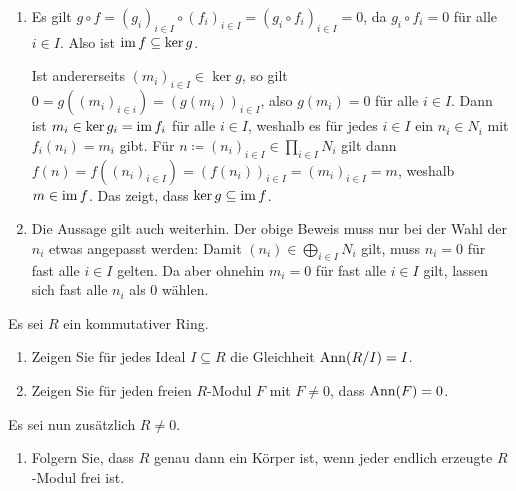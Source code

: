 \begin{solution}
  \begin{enumerate}
    \item
      Es gilt $g \circ f = (g_i)_{i \in I} \circ (f_i)_{i \in I} = (g_i \circ f_i)_{i \in I} = 0$, da $g_i \circ f_i = 0$ für alle $i \in I$.
      Also ist $\operatorname{im} f \subseteq \ker g$.
      
      Ist andererseits $(m_i)_{i \in I} \in \ker g$, so gilt $0 = g((m_i)_{i \in i}) = (g(m_i))_{i \in I}$, also $g(m_i) = 0$ für alle $i \in I$.
      Dann ist $m_i \in \ker g_i = \operatorname{im} f_i$ für alle $i \in I$, weshalb es für jedes $i \in I$ ein $n_i \in N_i$ mit $f_i(n_i) = m_i$ gibt.
      Für $n \coloneqq (n_i)_{i \in I} \in \prod_{i \in I} N_i$ gilt dann $f(n) = f((n_i)_{i \in I}) = (f(n_i))_{i \in I} = (m_i)_{i \in I} = m$, weshalb $m \in \operatorname{im} f$.
      Das zeigt, dass $\ker g \subseteq \operatorname{im} f$.
    \item
      Die Aussage gilt auch weiterhin.
      Der obige Beweis muss nur bei der Wahl der $n_i$ etwas angepasst werden:
      Damit $(n_i) \in \bigoplus_{i \in I} N_i$ gilt, muss $n_i = 0$ für fast alle $i \in I$ gelten.
      Da aber ohnehin $m_i = 0$ für fast alle $i \in I$ gilt, lassen sich fast alle $n_i$ als $0$ wählen.
  \end{enumerate}
\end{solution}


\begin{question}[subtitle = Annihilatoren von Quotienten]
  \label{question: annihilators of quotients}
  Es sei $R$ ein kommutativer Ring.
  \begin{enumerate}
    \item
      Zeigen Sie für jedes Ideal $I \subseteq R$ die Gleichheit $\operatorname{Ann}(R/I) = I$.
    \item
      Zeigen Sie für jeden freien $R$-Modul $F$ mit $F \neq 0$, dass $\operatorname{Ann}(F) = 0$.
  \end{enumerate}
  Es sei nun zusätzlich $R \neq 0$.
  \begin{enumerate}[resume]
    \item
      Folgern Sie, dass $R$ genau dann ein Körper ist, wenn jeder endlich erzeugte $R$-Modul frei ist.
  \end{enumerate}
\end{question}



